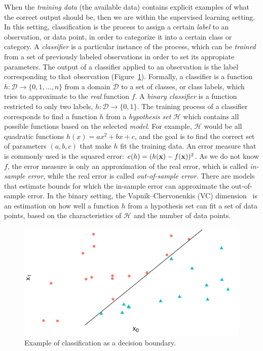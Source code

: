 When the {\em training data} (the available data) contains explicit examples of
what the correct output should be, then we are within the supervised learning
setting.
%
In this setting, classification is the process to assign a certain {\em label}
to an observation, or data point, in order to categorize it into a certain class
or category.
%
A {\em classifier} is a particular instance of the process, which can be {\em
trained} from a set of previously labeled observations in order to set its
appropiate parameters.
%
The output of a classifier applied to an observation is the label corresponding
to that observation (Figure~\ref{background:fig:clf-ex}).
%
Formally, a classifier is a function $h: \mathcal{D} \rightarrow \{0, 1, \ldots,
n\}$ from a domain $\mathcal{D}$ to a set of classes, or class labels, which
tries to approximate to the {\em real} function $f$.
%
A {\em binary classifier} is a function restricted to only two labels, $h:
\mathcal{D} \rightarrow \{0, 1\}$.
%
The training process of a classifier corresponds to find a function $h$ from a
{\em hypothesis set} $\mathcal{H}$ which contains all possible functions based
on the selected {\em model}.
%
For example, $\mathcal{H}$ would be all quadratic functions $h(x) = ax^2 + bx +
c$, and the goal is to find the correct set of parameters $(a, b, c)$ that make
$h$ fit the training data.
%
An error measure that is commonly used is the squared error: $e(h) =
(h(\boldsymbol{\mathbf{x}}) - f(\boldsymbol{\mathbf{x}}))^2$.
%
As we do not know $f$, the error measure is only an approximation of the real
error, which is called {\em in-sample error}, while the real error is called
{\em out-of-sample error}.
% 
There are models that estimate bounds for which the in-sample error can
approximate the out-of-sample error.
%
In the binary setting, the Vapnik–Chervonenkis (VC) dimension~\cite{Vapnik2015}
is an estimation on how well a function $h$ from a hypothesis set can fit a set
of data points, based on the characteristics of $\mathcal{H}$ and the number of
data points.

%
\begin{figure}
    \centering
    \includegraphics[width=.8\textwidth]{figures/background/classification-example}
    \caption{Example of classification as a decision boundary.}
    \label{background:fig:clf-ex}
\end{figure}%


